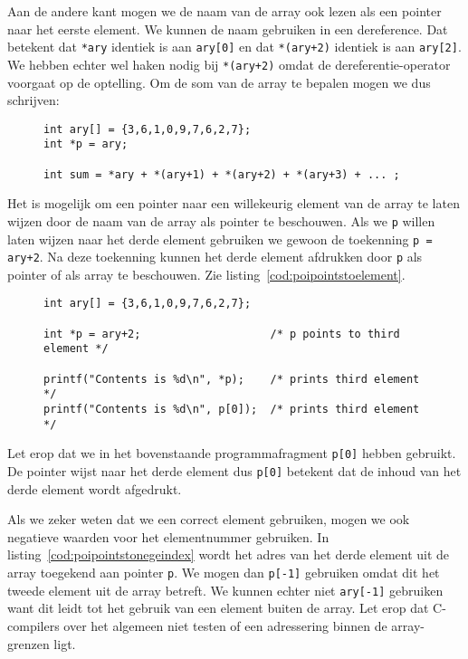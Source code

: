 Aan de andere kant mogen we de naam van de array ook lezen als een pointer naar het eerste element. We kunnen de naam gebruiken in een dereference. Dat betekent dat \texttt{*ary} identiek is aan \texttt{ary[0]} en dat \texttt{*(ary+2)} identiek is aan \texttt{ary[2]}. We hebben echter wel haken nodig bij \texttt{*(ary+2)} omdat de dereferentie-operator voorgaat op de optelling. Om de som van de array te bepalen mogen we dus schrijven:

\begin{figure}[!ht]
\begin{lstlisting}[caption=Bepalen sum van elementen in een array.,label=cod:poiarrayandpointersym2]
int ary[] = {3,6,1,0,9,7,6,2,7};
int *p = ary;

int sum = *ary + *(ary+1) + *(ary+2) + *(ary+3) + ... ;
\end{lstlisting}
\end{figure}

Het is mogelijk om een pointer naar een willekeurig element van de array te laten wijzen door de naam van de array als pointer te beschouwen. Als we \texttt{p} willen laten wijzen naar het derde element gebruiken we gewoon de toekenning \texttt{p = ary+2}. Na deze toekenning kunnen het derde element afdrukken door \texttt{p} als pointer of als array te beschouwen. Zie listing~\ref{cod:poipointstoelement}.

\begin{figure}[!ht]
\begin{lstlisting}[caption=Pointer die naar een element in een array wijst.,label=cod:poipointstoelement]
int ary[] = {3,6,1,0,9,7,6,2,7};

int *p = ary+2;                    /* p points to third element */

printf("Contents is %d\n", *p);    /* prints third element */
printf("Contents is %d\n", p[0]);  /* prints third element */
\end{lstlisting}
\end{figure}

Let erop dat we in het bovenstaande programmafragment \texttt{p[0]} hebben gebruikt. De pointer wijst naar het derde element dus \texttt{p[0]} betekent dat de inhoud van het derde element wordt afgedrukt.

Als we zeker weten dat we een correct element gebruiken, mogen we ook negatieve waarden voor het elementnummer gebruiken. In listing~\ref{cod:poipointstonegeindex} wordt het adres van het derde element uit de array toegekend aan pointer \texttt{p}. We mogen dan \texttt{p[-1]} gebruiken omdat dit het tweede element uit de array betreft. We kunnen echter niet \texttt{ary[-1]} gebruiken want dit leidt tot het gebruik van een element buiten de array. Let erop dat C-compilers over het algemeen niet testen of een adressering binnen de array-grenzen ligt.

